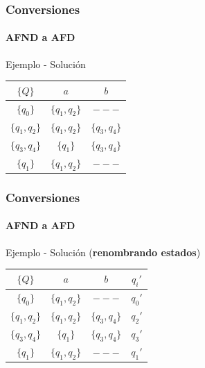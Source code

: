 \documentclass{beamer}
\begin{document}
        \begin{frame}
			\frametitle{Conversiones}
			\framesubtitle{AFND a AFD}

            \begin{exampleblock}{Ejemplo - Soluci\'on}
               \begin{table}
                   \begin{center}
                       \begin{tabular}{c|c|c} 
                           $\{Q\}$ & $a$ & $b$ \\ \hline
                           $\{q_{0}\}$ & $\{q_{1}, q_{2}\}$ & $---$ \\
                           $\{q_{1}, q_{2}\}$ & $\{q_{1}, q_{2}\}$ & $\{q_{3}, q_{4}\}$ \\
                           $\{q_{3}, q_{4}\}$ & $\{q_{1}\}$ & $\{q_{3}, q_{4}\}$ \\
                           $\{q_{1}\}$ & $\{q_{1}, q_{2}\}$ & $---$ \\
                       \end{tabular}
                   \end{center}
               \end{table}
            \end{exampleblock}
		\end{frame}				
		
        \begin{frame}
			\frametitle{Conversiones}
			\framesubtitle{AFND a AFD}

            \begin{exampleblock}{Ejemplo - Soluci\'on (\textbf{renombrando estados})}
               \begin{table}
                   \begin{center}
                       \begin{tabular}{c|c|c|c} 
                           $\{Q\}$ & $a$ & $b$ & $q_{i}'$ \\ \hline
                           $\{q_{0}\}$ & $\{q_{1}, q_{2}\}$ & $---$ & $q_{0}'$\\
                           $\{q_{1}, q_{2}\}$ & $\{q_{1}, q_{2}\}$ & $\{q_{3}, q_{4}\}$ & $q_{2}'$ \\
                           $\{q_{3}, q_{4}\}$ & $\{q_{1}\}$ & $\{q_{3}, q_{4}\}$ & $q_{3}'$ \\
                           $\{q_{1}\}$ & $\{q_{1}, q_{2}\}$ & $---$ & $q_{1}'$\\
                       \end{tabular}
                   \end{center}
               \end{table}
            \end{exampleblock}
		\end{frame}		
		
\end{document}
